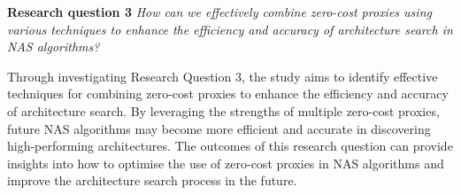 \textbf{Research question 3} \textit{How can we effectively combine zero-cost proxies using various techniques to enhance the efficiency and accuracy of architecture search in \gls{NAS} algorithms?}

Through investigating Research Question 3, the study aims to identify effective techniques for combining zero-cost proxies to enhance the efficiency and accuracy of architecture search. By leveraging the strengths of multiple zero-cost proxies, future \gls{NAS} algorithms may become more efficient and accurate in discovering high-performing architectures. The outcomes of this research question can provide insights into how to optimise the use of zero-cost proxies in \gls{NAS} algorithms and improve the architecture search process in the future.